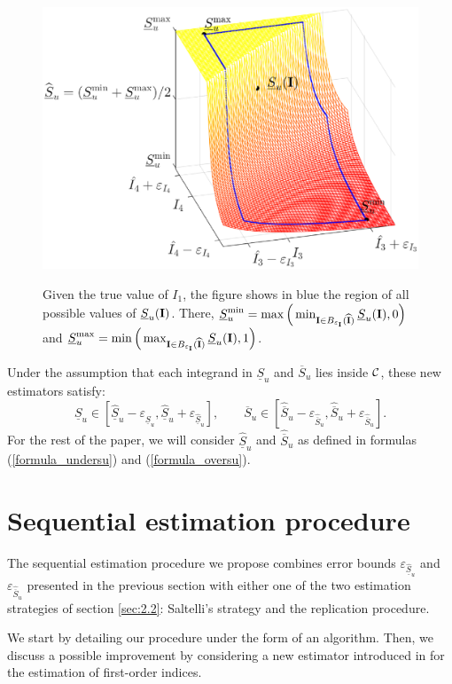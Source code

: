 \begin{figure}[!ht]
\caption{Given the true value of $I_1$, the figure shows in blue the region of all possible values of $\underline{S}_u(\boldsymbol{\mathbf{I}})$. There, $\underline{S}_u^{\min}=\max\Big{(}\min_{\boldsymbol{\mathbf{I}}\in B_{\varepsilon_{\boldsymbol{\mathbf{I}}}}(\widehat{\boldsymbol{\mathbf{I}}})} \underline{S}_u(\boldsymbol{\mathbf{I}}),0\Big{)}$ and $\underline{S}_u^{\max}=\min\Big{(}\max_{\boldsymbol{\mathbf{I}}\in B_{\varepsilon_{\boldsymbol{\mathbf{I}}}}(\widehat{\boldsymbol{\mathbf{I}}})} \underline{S}_u(\boldsymbol{\mathbf{I}}),1\Big{)}$.}
\centering
\includegraphics[width=.5\textwidth]{Images/estimator_3d_small.eps}
\label{fig:1}       %
\end{figure}

Under the assumption that each integrand in $\underline{S}_u$ and $\overline{S}_u$ lies inside $\mathcal{C}$, these new estimators satisfy: \[ \underline{S}_u\in \left[ \widehat{\underline{S}}_u - \varepsilon_{\widehat{\underline{S}}_u}, \widehat{\underline{S}}_u + \varepsilon_{\widehat{\underline{S}}_u} \right], \qquad \overline{S}_u\in \left[ \widehat{\overline{S}}_u - \varepsilon_{\widehat{\overline{S}}_u}, \widehat{\overline{S}}_u + \varepsilon_{\widehat{\overline{S}}_u} \right] .\]
For the rest of the paper, we will consider $\widehat{\underline{S}}_u$ and $\widehat{\overline{S}}_u$   as defined in formulas (\ref{formula_undersu}) and (\ref{formula_oversu}).

\section{Sequential estimation procedure}
\label{sec:4}
The sequential estimation procedure we propose combines error bounds $\varepsilon_{\widehat{\underline{S}}_u}$ and $\varepsilon_{\widehat{\overline{S}}_u}$ presented in the previous section with either one of the two estimation strategies of section \ref{sec:2.2}: Saltelli's strategy and the replication procedure. 

We start by detailing our procedure under the form of an algorithm. Then, we discuss a possible improvement by considering a new estimator introduced in \cite{Owen} for the estimation of first-order indices.

